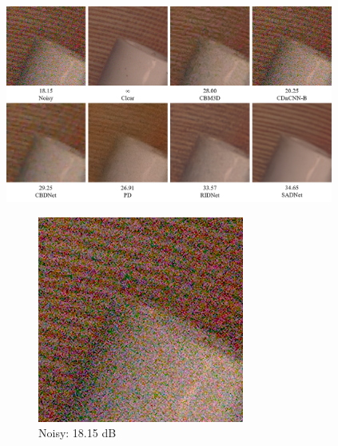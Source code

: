 \begin{figure}[b!]
    \centering
        \includegraphics[width=0.96\textwidth]{images/bardak.png}
        \begin{subfigure}{0.3\textwidth}
            \includegraphics[width=\linewidth]{images/bardak_noisy.png}
            \caption{Noisy: 18.15 dB}
            \label{fig:bardak_noisy}
        \end{subfigure}\hfil %
        \begin{subfigure}{0.3\textwidth}

\end{subfigure}
\end{figure}
